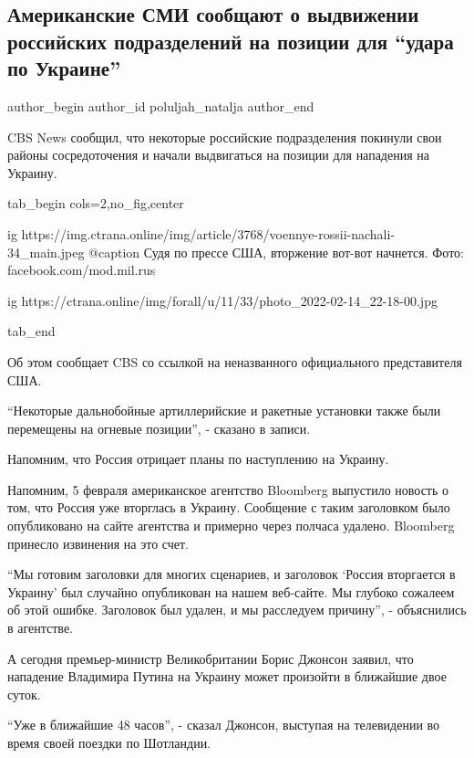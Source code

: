  
 
 
 
 
 
\subsection{Американские СМИ сообщают о выдвижении российских подразделений на позиции для \enquote{удара по Украине}}
\label{sec:14_02_2022.stz.news.ua.strana.2.rossia_armia_usa_smi_udar_po_ukraine}
 
\ifcmt
 author_begin
   author_id poluljah_natalja
 author_end
\fi

CBS News сообщил, что некоторые российские подразделения покинули свои районы
сосредоточения и начали выдвигаться на позиции для нападения на Украину.

\ifcmt
  tab_begin cols=2,no_fig,center

  ig https://img.ctrana.online/img/article/3768/voennye-rossii-nachali-34_main.jpeg
  @caption Судя по прессе США, вторжение вот-вот начнется. Фото: facebook.com/mod.mil.rus

  ig https://ctrana.online/img/forall/u/11/33/photo_2022-02-14_22-18-00.jpg

  tab_end
\fi

Об этом сообщает CBS со ссылкой на неназванного официального представителя США.

\enquote{Некоторые дальнобойные артиллерийские и ракетные установки также были
перемещены на огневые позиции}, - сказано в записи.

Напомним, что Россия отрицает планы по наступлению на Украину.

Напомним, 5 февраля американское агентство Bloomberg выпустило новость о том,
что Россия уже вторглась в Украину. Сообщение с таким заголовком было
опубликовано на сайте агентства и примерно через полчаса удалено. Bloomberg
принесло извинения на это счет.

\enquote{Мы готовим заголовки для многих сценариев, и заголовок \enquote{Россия
вторгается в Украину} был случайно опубликован на нашем веб-сайте. Мы глубоко
сожалеем об этой ошибке. Заголовок был удален, и мы расследуем причину}, -
объяснились в агентстве.

А сегодня премьер-министр Великобритании Борис Джонсон заявил, что нападение
Владимира Путина на Украину может произойти в ближайшие двое суток.

\enquote{Уже в ближайшие 48 часов}, - сказал Джонсон, выступая на телевидении
во время своей поездки по Шотландии.
